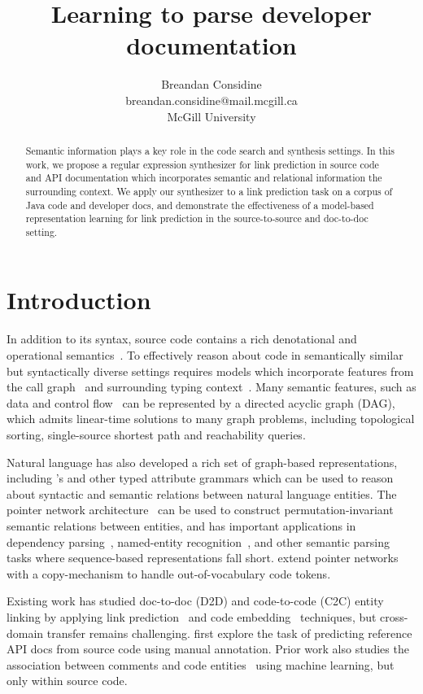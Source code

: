 \documentclass{article}
\title{Learning to parse developer documentation}
\author{Breandan Considine\\
breandan.considine@mail.mcgill.ca\\
McGill University}
\begin{document}
\maketitle

\begin{abstract}
Semantic information plays a key role in the code search and synthesis settings. In this work, we propose a regular expression synthesizer for link prediction in source code and API documentation which incorporates semantic and relational information the surrounding context. We apply our synthesizer to a link prediction task on a corpus of Java code and developer docs, and demonstrate the effectiveness of a model-based representation learning for link prediction in the source-to-source and doc-to-doc setting.
\end{abstract}

\section{Introduction}

In addition to its syntax, source code contains a rich denotational and operational semantics~\citep{henkel2018code}. To effectively reason about code in semantically similar but syntactically diverse settings requires models which incorporate features from the call graph~\citep{gu2016deep, liu2019neural} and surrounding typing context~\citep{allamanis2017learning}. Many semantic features, such as data and control flow~\citep{si2018learning} can be represented by a directed acyclic graph (DAG), which admits linear-time solutions to many graph problems, including topological sorting, single-source shortest path and reachability queries.

Natural language has also developed a rich set of graph-based representations, including \citet{reddy2016transforming}'s and other typed attribute grammars which can be used to reason about syntactic and semantic relations between natural language entities. The pointer network architecture~\citep{vinyals2015pointer, vinyals2015order} can be used to construct permutation-invariant semantic relations between entities, and has important applications in dependency parsing~\citep{ma2018stack}, named-entity recognition~\citep{lample2016neural}, and other semantic parsing tasks where sequence-based representations fall short. \citet{li2017code} extend pointer networks with a copy-mechanism to handle out-of-vocabulary code tokens.

Existing work has studied doc-to-doc (D2D) and code-to-code (C2C) entity linking by applying link prediction~\citep{zhang2018link} and code embedding~\citep{gu2018deep} techniques, but cross-domain transfer remains challenging. \citet{robillard2015recommending, robillard2017demand} first explore the task of predicting reference API docs from source code using manual annotation. Prior work also studies the association between comments and code entities~\citep{iyer2018mapping, panthaplackel2020associating} using machine learning, but only within source code.
\end{document}
